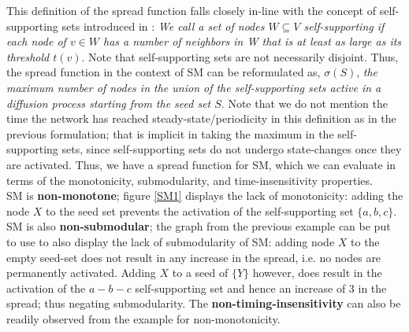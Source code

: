 \documentclass[twocolumn, 10pt]{article}
\begin{document}
This definition of the spread function falls closely in-line with the concept of self-supporting sets introduced in \cite{vig}: \textit{We call a set of nodes $W \subseteq V$ self-supporting if each node of $v \in W$ has a number of neighbors in W that is at least as large as its threshold $t(v)$\cite{vig}}. Note that self-supporting sets are not necessarily disjoint. Thus, the spread function in the context of SM can be reformulated as, $\sigma(S)$, \textit{the maximum number of nodes in the union of the self-supporting sets active in a diffusion process starting from the seed set $S$}. Note that we do not mention the time the network has reached steady-state/periodicity in this definition as in the previous formulation; that is implicit in taking the maximum in the self-supporting sets, since self-supporting sets do not undergo state-changes once they are activated. Thus, we have a spread function for SM, which we can evaluate in terms of the monotonicity, submodularity, and time-insensitivity properties. \\
SM is \textbf{non-monotone}; figure \ref{SM1} displays the lack of monotonicity: adding the node $X$ to the seed set prevents the activation of the self-supporting set $\{a, b, c\}$. SM is also \textbf{non-submodular}; the graph from the previous example can be put to use to also display the lack of submodularity of SM: adding node $X$ to the empty seed-set does not result in any increase in the spread, i.e. no nodes are permanently activated. Adding $X$ to a seed of $\{Y\}$ however, does result in the activation of the $a-b-c$ self-supporting set and hence an increase of 3 in the spread; thus negating submodularity. The \textbf{non-timing-insensitivity} can also be readily observed from the example for non-monotonicity.
\end{document}
